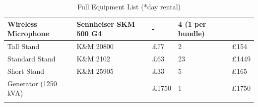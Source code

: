 \begin{longtable}[H]{|p{3cm}|p{4cm}|p{2cm}|p{3cm}|p{2cm}|}
Wireless Microphone                & Sennheiser SKM 500 G4              & -                             & 4 (1 per bundle)                   &        \\ \hline
\rowcolor[HTML]{EFEFEF} 
Tall Stand                         & K\&M 20800                          & £77                           & 2                                  & £154   \\ \hline
\rowcolor[HTML]{EFEFEF} 
Standard Stand                     & K\&M 2102                           & £63                           & 23                                 & £1449  \\ \hline
\rowcolor[HTML]{EFEFEF} 
Short Stand                        & K\&M 25905                          & £33                           & 5                                  & £165   \\ \hline
Generator (1250 kVA)        &                &      £1750    &        1           &    £1750    \\ \hline
                    \caption{Full Equipment List (*day rental)}
                    \label{tab:full_equipment_list}
                \end{longtable}